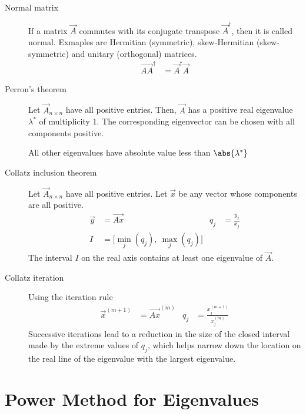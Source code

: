 \begin{description}
    \item[Normal matrix] If a matrix $ \vec{A} $ commutes with its conjugate
        transpose $ \vec{A}^\dag $, then it is called normal. Exmaples are Hermitian
        (symmetric), skew-Hermitian (skew-symmetric) and unitary (orthogonal) matrices.
        \begin{align}
            \vec{AA}^\dag & = \vec{A}^\dag \vec{A}
        \end{align}

    \item[Perron's theorem] Let $ \vec{A}_{n\times n} $ have all positive entries. Then,
        $ \vec{A} $ has a positive real eigenvalue $ \lambda^* $ of multiplicity 1. The
        corresponding eigenvector can be chosen with all components positive. \par
        All other eigenvalues have absolute value less than $ \abs{\lambda^*} $

    \item[Collatz inclusion theorem] Let $ \vec{A}_{n\times n} $ have all positive
        entries. Let $ \vec{x} $ be any vector whose components are all positive.
        \begin{align}
            \vec{y} & = \vec{Ax}                                 &
            q_j     & = \frac{y_j}{x_j}                            \\
            I       & = \Big[\min_j{(q_j)},\  \max_j{(q_j)}\Big]
        \end{align}
        The interval $ I $ on the real axis contains at least one eigenvalue of
        $ \vec{A} $.

    \item[Collatz iteration] Using the iteration rule
        \begin{align}
            \vec{x}^{(m+1)} & = \vec{Ax}^{(m)} & q_j & = \frac{x^{(m+1)}_j}{x^{(m)}_j}
        \end{align}
        Successive iterations lead to a reduction in the size of the closed interval
        made by the extreme values of $ q_j $, which helps narrow down the location
        on the real line of the eigenvalue with the largest eigenvalue.

\end{description}

\section{Power Method for Eigenvalues}

